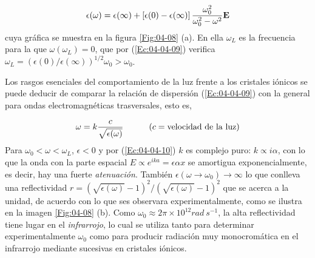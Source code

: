 \begin{equation}
	\epsilon (\omega) = \epsilon(\infty) + \left[ \epsilon(0)-\epsilon(\infty) \right] \frac{\omega_0^2}{\omega_0^2 - \omega^2} \mathbf{E}\label{Ec:04-04-09}
\end{equation}
cuya gráfica se muestra en la figura \ref{Fig:04-08} (a). En ella $\omega_L$ es la frecuencia para la que $\omega(\omega_L)=0$, que por  (\ref{Ec:04-04-09}) verifica $\omega_L = (\epsilon(0)/\epsilon(\infty))^{1/2} \omega_0 >\omega_0$.


Los rasgos esenciales del comportamiento de la luz frente a los cristales iónicos se puede deducir de comparar la relación de dispersión (\ref{Ec:04-04-09}) con la general para ondas electromagnéticas trasversales, esto es,

\begin{equation}
	\omega = k \frac{c}{\sqrt{\epsilon(\omega)}} \quad \quad \quad (c = \text{velocidad de la luz})	\label{Ec:04-04-10}
\end{equation}
Para $\omega_0 < \omega < \omega_L$, $\epsilon <0$ y por (\ref{Ec:04-04-10}) $k$ es complejo puro: $k \propto i \alpha$, con lo que la onda con la parte espacial $E \propto e^{ika} = \epsilon{\alpha x}$ se amortigua exponencialmente, es decir, hay una fuerte \textit{atenuación}. También $\epsilon (\omega \rightarrow \omega_0) \rightarrow \infty$ lo que conlleva una reflectividad $r= (\sqrt{\epsilon(\omega)}-1)^2 / (\sqrt{\epsilon(\omega)}-1)^2$ que se acerca a la unidad, de acuerdo con lo que ses observara experimentalmente, como se ilustra en la imagen \ref{Fig:04-08} (b). Como $\omega_0\approx 2 \pi \times 10^{12} \unit{rad \ s^{-1}}$, la alta reflectividad tiene lugar en el \textit{infrarrojo}, lo cual se utiliza tanto para determinar experimentalmente $\omega_0$ como para producir radiación muy monocromática en el infrarrojo mediante sucesivas en cristales iónicos.
